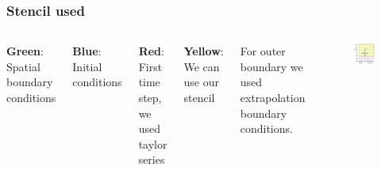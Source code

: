 \documentclass[hyperref={bookmarks=false},aspectratio=169]{beamer}
\begin{document}
\begin{frame}
    \frametitle{Stencil used}
    \begin{columns}
        \textbf{Green}: Spatial boundary conditions

        \textbf{Blue}: Initial conditions

        \textbf{Red}: First time step, we used taylor series

        \textbf{Yellow}: We can use our stencil

        For outer boundary we used extrapolation boundary conditions.

        \begin{figure}[hbt!]
            \centering
            \includegraphics[width=.75\textwidth]{images/labelled_grid.eps}

        \end{figure}
    \end{columns}

\end{frame}
\end{document}
